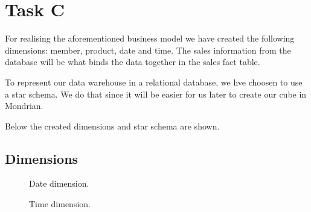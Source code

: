 \section{Task C}
For realising the aforementioned business model we have created the following dimensions:
member, product, date and time.
The sales information from the database will be what binds the data together in the sales fact table. 

To represent our data warehouse in a relational database, we hve choosen to use a star schema.
We do that since it will be easier for us later to create our cube in Mondrian.

Below the created dimensions and star schema are shown.



\subsection{Dimensions}

\begin{figure}[H]
    \centering
    \begin{minipage}[b]{0.4\textwidth}
        \caption{Date dimension.}
        \label{fig:date_dim}
    \end{minipage}
    \begin{minipage}[b]{0.4\textwidth}
        \caption{Time dimension.}
        \label{fig:time_dim}
    \end{minipage}
\end{figure}

